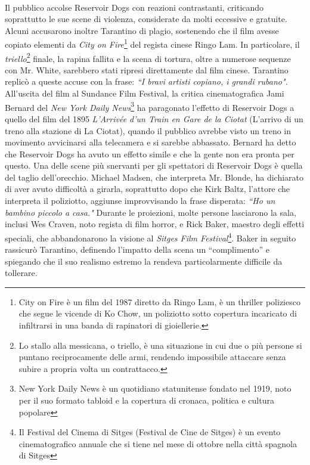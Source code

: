 \documentclass[12pt]{article} %
\begin{document}
\begin{flushleft}
    \\\vspace{1cm}
    Il pubblico accolse Reservoir Dogs con reazioni contrastanti, criticando soprattutto le sue scene di violenza, considerate da molti eccessive e gratuite.
    Alcuni accusarono inoltre Tarantino di plagio, sostenendo che il film avesse copiato elementi da \textit{City on Fire}\footnote{City on Fire è un film del 1987 diretto da Ringo Lam, è un thriller poliziesco che segue le vicende di Ko Chow, un poliziotto sotto copertura incaricato di infiltrarsi in una banda di rapinatori di gioiellerie.} del regista cinese Ringo Lam.
    In particolare, il \textit{triello}\footnote{Lo stallo alla messicana, o triello, è una situazione in cui due o più persone si puntano reciprocamente delle armi, rendendo impossibile attaccare senza subire a propria volta un contrattacco.} finale, la rapina fallita e la scena di tortura, oltre a numerose sequenze con Mr. White, sarebbero stati ripresi direttamente dal film cinese. Tarantino replicò a queste accuse con la frase: \textit{``I bravi artisti copiano, i grandi rubano"}.
    All'uscita del film al Sundance Film Festival, la critica cinematografica Jami Bernard del \textit{New York Daily News}\footnote{New York Daily News è un quotidiano statunitense fondato nel 1919, noto per il suo formato tabloid e la copertura di cronaca, politica e cultura popolare} ha paragonato l'effetto di Reservoir Dogs a quello del film del 1895 \textit{L'Arrivée d'un Train en Gare de la Ciotat} (L'arrivo di un treno alla stazione di La Ciotat), quando il pubblico avrebbe visto un treno in movimento avvicinarsi alla telecamera e si sarebbe abbassato.
    Bernard ha detto che Reservoir Dogs ha avuto un effetto simile e che la gente non era pronta per questo.
    Una delle scene più snervanti per gli spettatori di Reservoir Dogs è quella del taglio dell’orecchio. Michael Madsen, che interpreta Mr. Blonde, ha dichiarato di aver avuto difficoltà a girarla, soprattutto dopo che Kirk Baltz, l’attore che interpreta il poliziotto, aggiunse improvvisando la frase disperata: \textit{``Ho un bambino piccolo a casa."} Durante le proiezioni, molte persone lasciarono la sala, inclusi Wes Craven, noto regista di film horror, e Rick Baker, maestro degli effetti speciali, che abbandonarono la visione al \textit{Sitges Film Festival}\footnote{Il Festival del Cinema di Sitges (Festival de Cine de Sitges) è un evento cinematografico annuale che si tiene nel mese di ottobre nella città spagnola di Sitges}. Baker in seguito rassicurò Tarantino, definendo l’impatto della scena un ``complimento” e spiegando che il suo realismo estremo la rendeva particolarmente difficile da tollerare.

\end{flushleft}
\end{document}
